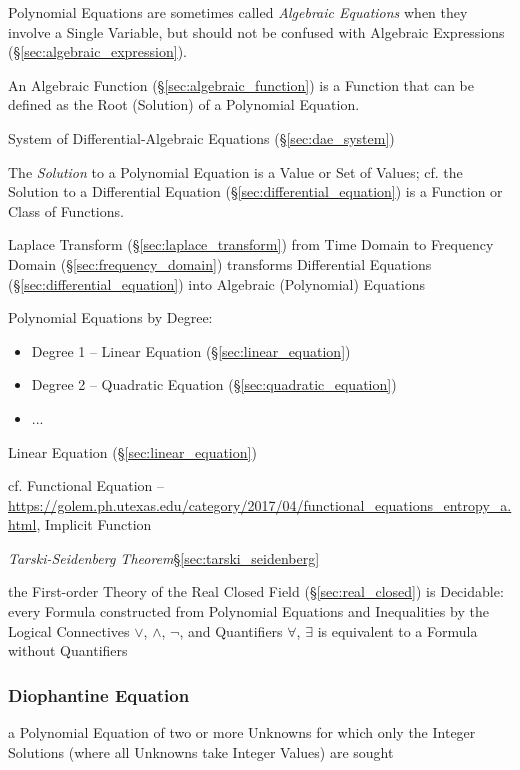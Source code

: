 \fist Polynomial Equations are sometimes called \emph{Algebraic Equations} when
they involve a Single Variable, but should not be confused with Algebraic
Expressions (\S\ref{sec:algebraic_expression}).

\fist An Algebraic Function (\S\ref{sec:algebraic_function}) is a Function that
can be defined as the Root (Solution) of a Polynomial Equation.

\fist System of Differential-Algebraic Equations (\S\ref{sec:dae_system})

The \emph{Solution} to a Polynomial Equation is a Value or Set of Values; cf.
the Solution to a Differential Equation (\S\ref{sec:differential_equation}) is
a Function or Class of Functions.

\fist Laplace Transform (\S\ref{sec:laplace_transform}) from Time Domain to
Frequency Domain (\S\ref{sec:frequency_domain}) transforms Differential
Equations (\S\ref{sec:differential_equation}) into Algebraic (Polynomial)
Equations

Polynomial Equations by Degree:
\begin{itemize}
  \item Degree 1 -- Linear Equation (\S\ref{sec:linear_equation})
  \item Degree 2 -- Quadratic Equation (\S\ref{sec:quadratic_equation})
  \item ...
\end{itemize}

Linear Equation (\S\ref{sec:linear_equation})

cf. Functional Equation --
\url{https://golem.ph.utexas.edu/category/2017/04/functional_equations_entropy_a.html},
Implicit Function %


\emph{Tarski-Seidenberg Theorem}\S\ref{sec:tarski_seidenberg}

the First-order Theory of the Real Closed Field (\S\ref{sec:real_closed}) is
Decidable: every Formula constructed from Polynomial Equations and Inequalities
by the Logical Connectives $\vee$, $\wedge$, $\neg$, and Quantifiers $\forall$,
$\exists$ is equivalent to a Formula without Quantifiers



\subsubsection{Diophantine Equation}\label{sec:diophantine_equation}

a Polynomial Equation of two or more Unknowns for which only the Integer
Solutions (where all Unknowns take Integer Values) are sought

